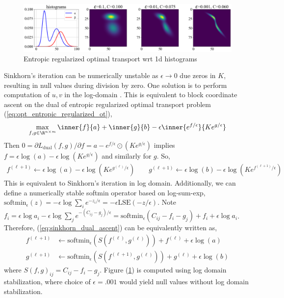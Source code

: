 \documentclass[11pt]{article}
\begin{document}
\begin{center} 
\begin{figure}[h!]
    \includegraphics[width=\textwidth]{assets/plt_sinkhorn_vary_epsilon} 
    \caption{Entropic regularized optimal transport wrt 1d histograms}
    \label{fig:plt_sinkhorn_vary_epsilon}
\end{figure}
\end{center} 

Sinkhorn's iteration can be numerically unstable as $\epsilon\to 0$ due zeros in $K$, resulting in null values during division by zero. One solution is to perform computation of $u,v$ in the log-domain \cite{chizatScalingAlgorithmsUnbalanced2017, schmitzerStabilizedSparseScaling2019}. This is equivalent to block coordinate ascent on the dual of entropic regularized optimal transport problem (\ref{eq:opt_entropic_regularized_ot}),
\begin{align}
    \max_{f,g\in\R^{n\times m}} \inner{f}{a} + \inner{g}{b} - \epsilon\inner{e^{f/\epsilon}}{Ke^{g/\epsilon}}
\end{align}
Then $0 = \partial L_{\text{dual}}(f,g)/\partial f = a - e^{f/\epsilon} \odot (Ke^{g/\epsilon})$ implies $f = \epsilon \log(a) - \epsilon \log(Ke^{g/\epsilon})$ and similarly for $g$. So,
\begin{align}
    f^{(\ell+1)}
        \leftarrow \epsilon \log(a) - \epsilon\log(Ke^{g^{(\ell)}/\epsilon})
    \quad\quad
    g^{(\ell+1)}
        \leftarrow \epsilon \log(b) - \epsilon\log(Ke^{f^{(\ell+1)}/\epsilon})
    \label{eq:sinkhorn_dual_ascent}
\end{align}
This is equivalent to Sinkhorn's iteration in log domain. Additionally, we can define a numerically stable softmin operator based on log-sum-exp, $\text{softmin}_{\epsilon}(z) = - \epsilon \log \sum_{i} e^{-z_i/\epsilon} = -\epsilon \text{LSE}(-z/\epsilon)$. Note $f_i = \epsilon \log a_i - \epsilon \log \sum_j e^{-(C_{ij}-g_j)/\epsilon} =\text{softmin}_{\epsilon}(C_{ij}-f_i-g_j) + f_i +  \epsilon \log a_i$. Therefore, (\ref{eq:sinkhorn_dual_ascent}) can be equivalently written as,
\begin{align}
    f^{(\ell+1)}
        &\leftarrow \text{softmin}_{\epsilon} (S(f^{(\ell)}, g^{(\ell)})) + f^{(\ell)} + \epsilon \log(a) \\ 
    g^{(\ell+1)}
        &\leftarrow \text{softmin}_{\epsilon} (S(f^{(\ell+1)}, g^{(\ell)})) + g^{(\ell)} + \epsilon \log(b)
    \label{eq:sinkhorn_dual_ascent2}
\end{align}
where $S(f,g)_{ij} = C_{ij}-f_i-g_j$. Figure (\ref{fig:plt_sinkhorn_vary_epsilon}) is computed using log domain stabilization, where choice of $\epsilon=.001$ would yield null values without log domain stabilization.
 
\end{document}
